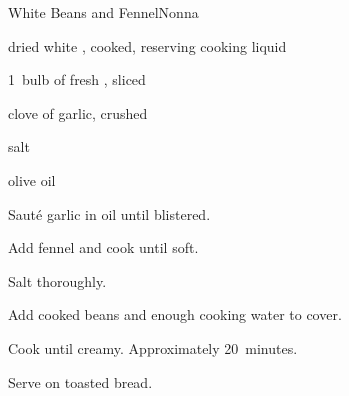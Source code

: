 \begin{recipe}{White Beans and Fennel}{Nonna}{}

\begin{ingredients}
\item {} dried white , cooked, reserving cooking liquid
\item 1~bulb of fresh , sliced
\item clove of garlic, crushed
\item salt
\item olive oil
\end{ingredients}

\begin{directions}
\item Saut\'e garlic in oil until blistered.
\item Add fennel and cook until soft.
\item Salt thoroughly.
\item Add cooked beans and enough cooking water to cover.
\item Cook until creamy. Approximately 20~minutes.
\item Serve on toasted bread.
\end{directions}

\end{recipe}
